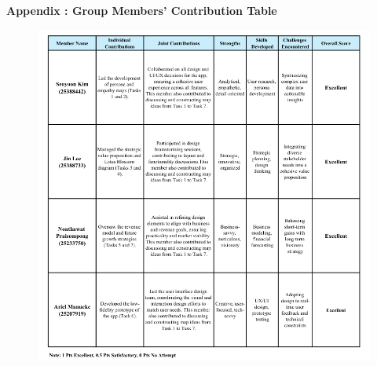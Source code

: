 \documentclass[12pt,a4paper]{article}
\begin{document}
\pagebreak





	
\def\UrlBreaks{\do\/\do-}

\clearpage



\setcounter{page}{21}
\textbf{Appendix : Group Members' Contribution Table}\\
\begin{figure}[h]
    \centering
    \includegraphics[width=1.0
    \textwidth]{images/Group members.png}
\end{figure}
\end{document}
